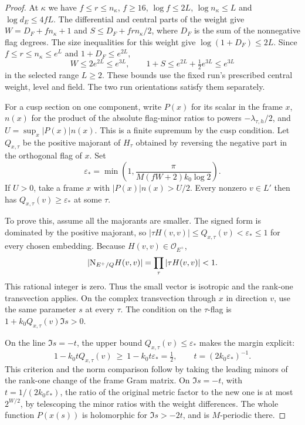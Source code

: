 \begin{proof}
At \(\kappa\) we have
\(f\le r\le n_\kappa\), \(f\ge16\),
\(\log f\le2L\), \(\log n_\kappa\le L\) and
\(\log d_E\le4fL\). The differential and central parts of the
weight give \(W=D_F+fn_\kappa+1\) and
\(S\le D_F+frn_\kappa/2\), where \(D_F\) is the sum of the
nonnegative flag degrees. The size inequalities for this weight
give \(\log(1+D_F)\le2L\). Since \(f\le r\le n_\kappa\le e^L\) and \(1+D_F\le e^{2L}\),
\[
 W\le2e^{2L}\le e^{3L},\qquad
 1+S\le e^{2L}+\tfrac12 e^{3L}\le e^{3L}
\]
in the selected range \(L\ge2\).
These bounds use the fixed run's prescribed central weight,
level and field. The two run orientations satisfy them
separately. \label{cor:slice-evaluation-net-1}

For a cusp section on one component, write \(P(x)\) for its
scalar in the frame \(x\), \(n(x)\) for the product of the
absolute flag-minor ratios to powers
\(-\lambda_{\tau,h}/2\), and \(U=\sup_x|P(x)|n(x)\).
This is a finite supremum by the cusp condition. Let \(Q_{x,\tau}\)
be the positive majorant of \(H_\tau\) obtained by reversing
the negative part in the orthogonal flag of \(x\). Set
\[
 \varepsilon_* = \min\left(1,
       \frac{\pi}{M(fW+2)k_0\log 2}\right).
\]
If \(U>0\), take a frame \(x\) with \(|P(x)|n(x)>U/2\).
Every nonzero \(v\in L'\) then has
\(Q_{x,\tau}(v)\ge\varepsilon_*\) at some \(\tau\).

To prove this, assume all the majorants are smaller.
The signed form is dominated by the positive majorant, so
\(|\tau H(v,v)|\le Q_{x,\tau}(v)<\varepsilon_*\le1\) for every
chosen embedding. Because \(H(v,v)\in\mathcal O_{E^+}\),
\[
      |\mathrm N_{E^+/Q}H(v,v)|
          =\prod_\tau |\tau H(v,v)|<1 .
\]
This rational integer is zero. Thus the small vector is isotropic
and the rank-one transvection applies.
On the complex transvection through \(x\) in direction \(v\),
use the same parameter \(s\) at every \(\tau\).
The condition on the \(\tau\)-flag is
\(1+k_0Q_{x,\tau}(v)\Im s>0\).

On the line \(\Im s=-t\), the upper bound \(Q_{x,\tau}(v)\le\varepsilon_*\)
makes the margin explicit:
\[
 1-k_0t Q_{x,\tau}(v)\ \ge\ 1-k_0t\varepsilon_*=\tfrac12,
 \qquad t=(2k_0\varepsilon_*)^{-1}.
\]
This criterion and the norm comparison follow by taking the
leading minors of the rank-one change of the frame Gram
matrix. On \(\Im s=-t\), with \(t=1/(2k_0\varepsilon_*)\),
the ratio of the original metric factor to the new one is
at most \(2^{W/2}\), by telescoping the minor ratios with
the weight differences. The whole function \(P(x(s))\) is
holomorphic for \(\Im s>-2t\), and is \(M\)-periodic there.


\end{proof}
